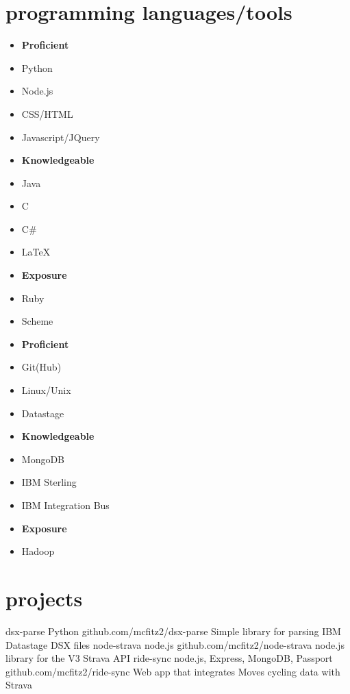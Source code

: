 \documentclass[]{friggeri-cv} %
\begin{document}
\section{programming languages/tools}
\vspace{-0.3cm}
\begin{multicols}{3}
 \begin{itemize}[noitemsep,nolistsep]
     \item[] \textbf{Proficient}
     \item[] Python
     \item[] Node.js
     \item[] CSS/HTML
     \item[] Javascript/JQuery
     \item[] \textbf{Knowledgeable }
     \item[] Java
     \item[] C
     \item[] C\#
     \item[] \LaTeX
     \item[] \textbf{Exposure}
     \item[] Ruby
     \item[] Scheme
 \end{itemize}
\end{multicols}
\vspace{-0.5cm}
\begin{multicols}{3}
 \begin{itemize}[noitemsep,nolistsep]
     \item[] \textbf{Proficient}
     \item[] Git(Hub)
     \item[] Linux/Unix
     \item[] Datastage
     \item[] \textbf{Knowledgeable }
     \item[] MongoDB
   	\item[] IBM Sterling
     \item[] IBM Integration Bus
     \item[] \textbf{Exposure}
   \item[] Hadoop
 \end{itemize}
\end{multicols}
\section{projects}
\vspace{-0.2cm}
 \begin{entrylist}
 \entry
     {dsx-parse}
     {Python}
     {github.com/mcfitz2/dsx-parse}
     {Simple library for parsing IBM Datastage DSX files}
     {}
     \entry
     {node-strava}
     {node.js}
     {github.com/mcfitz2/node-strava}
     {node.js library for the V3 Strava API}
     {}
    \entry
     {ride-sync}
     {node.js, Express, MongoDB, Passport}
     {github.com/mcfitz2/ride-sync}
     {Web app that integrates Moves cycling data with Strava}
     {}
 \end{entrylist}
\end{document}

